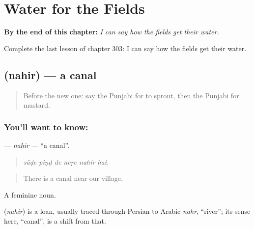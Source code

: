 
\chapter{Water for the Fields}
\label{ch:pa-a2-water-for-the-fields}

\begin{chapteropening}
\textbf{By the end of this chapter:} \emph{I can say how the fields get their water.}

Complete the last lesson of chapter 303: I can say how the fields get their water.
\end{chapteropening}

\section[\texorpdfstring{\pa{ਨਹਿਰ} (nahir)}{ਨਹਿਰ (nahir)}]{ (nahir) — a canal}

\label{lesson:PA-C303-nahir}



\begin{quote}
Before the new one: say the Punjabi for to sprout, then the Punjabi for mustard.
\end{quote}

\subsection*{You'll want to know: }
\textbf{} — \emph{nahir} — \textquotedblleft{}a canal\textquotedblright{}.

\begin{quote}
     
\end{quote}

\begin{quote}
\emph{sāḍe piṇḍ de neṛe nahir hai.}
\end{quote}

\begin{quote}
There is a canal near our village.
\end{quote}

A feminine noun.

\begin{cousinweb}
\textbf{} (\emph{nahir}) is a loan, usually traced through Persian to Arabic \emph{nahr}, \textquotedblleft{}river\textquotedblright{}; its sense here, \textquotedblleft{}canal\textquotedblright{}, is a shift from that.
\end{cousinweb}


